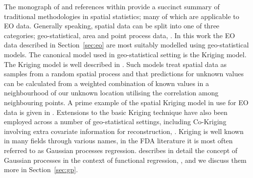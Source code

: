The monograph of \cite{cressie_statistics_2010} and references within provide a succinct summary of traditional methodologies in spatial statistics; many of which are applicable to EO data.
Generally speaking, spatial data can be split into one of three categories; geo-statistical, area and point process data, \citep{cressie_statistics_2010}.
In this work the EO data described in Section~\ref{sec:eo}  are most suitably modelled using geo-statistical models.
The canonical model used in geo-statistical setting is the Kriging model.
The Kriging model is well described in \cite{stein_interpolation_1999}.
Such models treat spatial data as samples from a random spatial process and that predictions for unknown values can be calculated from a weighted combination of known values in a neighbourhood of our unknown location utilising the correlation among neighbouring points.
A prime example of the spatial Kriging model in use for EO data is given in \cite{rossi_kriging_1994}.
Extensions to the basic Kriging technique have also been employed across a number of geo-statistical settings, including Co-Kriging involving extra covariate information for reconstruction, \cite{zhang_restoration_2009}.
Kriging is well known in many fields through various names, in the FDA literature it is most often referred to as Gaussian processes regression.
\citeauthor{shi_gaussian_2011} describes in detail the concept of Gaussian processes in the context of functional regression, \citep{shi_gaussian_2011}, and we discuss them more in Section~\ref{sec:gp}. 

